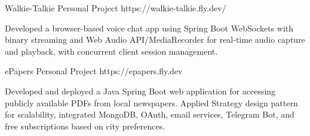\documentclass[10pt]{article}
\begin{document}
{ %
 

        \project
        {Walkie-Talkie}
        {Personal Project}
        {https://walkie-talkie.fly.dev/}
        {\begin{newitemize}
            \item Developed a browser-based voice chat app using Spring Boot WebSockets with binary streaming and Web Audio API/MediaRecorder for real-time audio capture and playback, with concurrent client session management.
        \end{newitemize}}

        \project
        {ePapers}
        {Personal Project}
        {https://epapers.fly.dev}
        {\begin{newitemize}
            \item {Developed and deployed a Java Spring Boot web application for accessing publicly available PDFs from local newspapers. Applied Strategy design pattern for scalability, integrated MongoDB, OAuth, email services, Telegram Bot, and free subscriptions based on city preferences.}
	\end{newitemize}}
 
}
\end{document}
